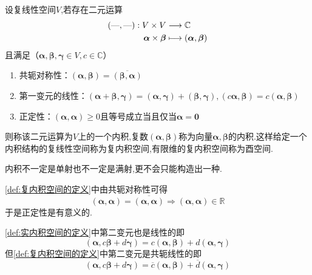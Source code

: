 \begin{formal}
    \begin{definition}[复内积空间的定义]\label{def:复内积空间的定义}
        设复线性空间$V$,若存在二元运算\begin{align*}
            \left(\text{---},\text{---}\right):V\times V&\longrightarrow\mathbb{C}\\
            \bm{\alpha}\times\bm{\beta}&\longmapsto\left(\bm{\alpha},\bm{\beta}\right)
        \end{align*}且满足（$\bm{\alpha},\bm{\beta},\bm{\gamma}\in V,c\in\mathbb{C}$）\begin{enumerate}[label={\textup{(\arabic*)}}]
            \item 共轭对称性：$\left(\bm{\alpha},\bm{\beta}\right)=\overline{\left(\bm{\beta},\bm{\alpha}\right)}$
            \item 第一变元的线性：$\left(\bm{\alpha}+\bm{\beta},\bm{\gamma}\right)=\left(\bm{\alpha},\bm{\gamma}\right)+\left(\bm{\beta},\bm{\gamma}\right),\left(c\bm{\alpha},\bm{\beta}\right)=c\left(\bm{\alpha},\bm{\beta}\right)$
            \item 正定性：$\left(\bm{\alpha},\bm{\alpha}\right)\geqslant 0$且等号成立当且仅当$\bm{\alpha}=\bm{0}$
        \end{enumerate}则称该二元运算为$V$上的一个内积,复数$\left(\bm{\alpha},\bm{\beta}\right)$称为向量$\bm{\alpha},\bm{\beta}$的内积.这样给定一个内积结构的复线性空间称为复内积空间,有限维的复内积空间称为酉空间.
    \end{definition}
\end{formal}
\begin{red}
    \begin{remark}
        内积不一定是单射也不一定是满射,更不会只能构造出一种.
    \end{remark}
\end{red}
\begin{red}
    \begin{remark}
        \cref{def:复内积空间的定义}中由共轭对称性可得\[
        \left(
            \bm{\alpha},\bm{\alpha}
        \right)=\overline{\left(
            \bm{\alpha},\bm{\alpha}
        \right)}\Longrightarrow\left(
            \bm{\alpha},\bm{\alpha}
        \right)\in\mathbb{R}
        \]于是正定性是有意义的.
    \end{remark}
\end{red}
\begin{red}
    \begin{remark}
        \cref{def:实内积空间的定义}中第二变元也是线性的即\[\left(\bm{\alpha},c\bm{\beta}+d\bm{\gamma}\right)=c\left(\bm{\alpha},\bm{\beta}\right)+d\left(\bm{\alpha},\bm{\gamma}\right)\]但\cref{def:复内积空间的定义}中第二变元是共轭线性的即\[\left(\bm{\alpha},c\bm{\beta}+d\bm{\gamma}\right)=\overline{c}\left(\bm{\alpha},\bm{\beta}\right)+\overline{d}\left(\bm{\alpha},\bm{\gamma}\right)\]
    \end{remark}
\end{red}
